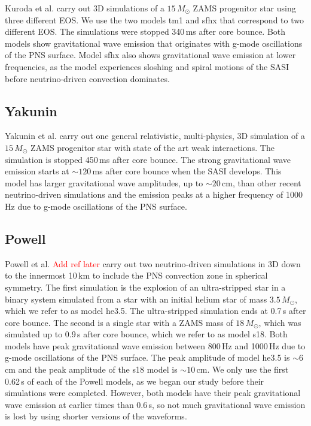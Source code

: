 \documentclass[letterpaper, aps, prd, twocolumn, superscriptaddress, showpacs, nofootinbib]{revtex4}
\newcommand{\jade}{\textcolor{red}}
\begin{document}
Kuroda et al. \cite{kuroda:16} carry out 3D simulations of a $15\,M_{\odot}$ ZAMS progenitor star using three different EOS. We use the two models tm1 and sfhx that correspond to two different EOS. The simulations were stopped 340\,ms after core bounce. Both models show gravitational wave emission that originates with g-mode oscillations of the PNS surface. Model sfhx also shows gravitational wave emission at lower frequencies, as the model experiences sloshing and spiral motions of the SASI before neutrino-driven convection dominates.    

\subsection{Yakunin}

Yakunin et al. \cite{2017arXiv170107325Y} carry out one general relativistic, multi-physics, 3D simulation of a $15\,M_{\odot}$ ZAMS progenitor star with state of the art weak interactions. The simulation is stopped 450\,ms after core bounce. The strong gravitational wave emission starts at $\sim120$\,ms after core bounce when the SASI develops. This model has larger gravitational wave amplitudes, up to $\sim20$\,cm, than other recent neutrino-driven simulations and the emission peaks at a higher frequency of 1000\,Hz due to g-mode oscillations of the PNS surface. 

\subsection{Powell}

Powell et al. \jade{Add ref later} carry out two neutrino-driven simulations in 3D down to the innermost 10\,km to include the PNS convection zone in spherical symmetry. The first simulation is the explosion of an ultra-stripped star in a binary system simulated from a star with an initial helium star of mass $3.5\,M_{\odot}$, which we refer to as model he3.5. The ultra-stripped simulation ends at 0.7\,s after core bounce. The second is a single star with a ZAMS mass of $18\,M_{\odot}$, which was simulated up to 0.9\,s after core bounce, which we refer to as model s18. Both models have peak gravitational wave emission between 800\,Hz and 1000\,Hz due to g-mode oscillations of the PNS surface. The peak amplitude of model he3.5 is $\sim6$\,cm and the peak amplitude of the s18 model is $\sim10$\,cm. We only use the first 0.62\,s of each of the Powell models, as we began our study before their simulations were completed. However, both models have their peak gravitational wave emission at earlier times than 0.6\,s, so not much gravitational wave emission is lost by using shorter versions of the waveforms.  
\end{document}
